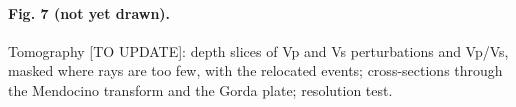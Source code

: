 \documentclass[11pt]{article}
\begin{document}
\paragraph{Fig. 7 (not yet drawn).} Tomography [TO UPDATE]: depth slices of Vp and Vs perturbations and Vp/Vs, masked where rays are too few, with the relocated events; cross-sections through the Mendocino transform and the Gorda plate; resolution test.



\end{document}
